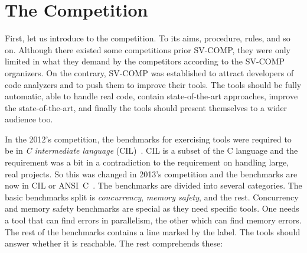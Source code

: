 \section{The Competition}\label{sec:svcomp_competition}
First, let us introduce to the competition. To its aims, procedure, rules,
and so on. Although there existed some competitions prior SV-COMP, they were
only limited in what they demand by the competitors according to the
SV-COMP organizers. On the contrary, SV-COMP was established to attract
developers of code analyzers and to push them to improve their tools. The
tools should be fully automatic, able to handle real code, contain
state-of-the-art approaches, improve the state-of-the-art, and finally the
tools should present themselves to a wider audience too.

In the 2012's competition, the benchmarks for exercising tools were required to
be in \emph{C intermediate language} (CIL)~\cite{cil}. CIL is a subset of the
C language and the requirement was a bit in a contradiction to the requirement
on handling large, real projects. So this was changed in 2013's competition
and the benchmarks are now in CIL or ANSI~C~\cite{ansi_c}. The benchmarks are
divided into several categories. The basic benchmarks split is
\emph{concurrency}, \emph{memory safety}, and the rest.  Concurrency and
memory safety benchmarks are special as they need specific tools. One needs a
tool that can find errors in parallelism, the other which can find memory
errors. The rest of the benchmarks contains a line marked by the 
label. The tools should answer whether it is reachable. The rest comprehends
these:
